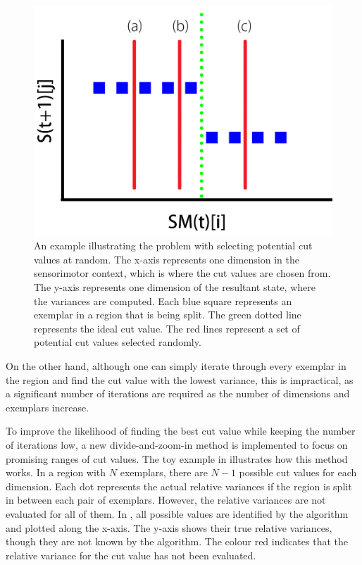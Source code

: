 \begin{figure}[htb]
	\centering
	\includegraphics[width=0.7 \textwidth]{"fig/cbla/bad-cut-example"}
	\caption[An example of making undesirable cuts using randomly selection method]{An example illustrating the problem with selecting potential cut values at random. The x-axis represents one dimension in the sensorimotor context, which is where the cut values are chosen from. The y-axis represents one dimension of the resultant state, where the variances are computed. Each blue square represents an exemplar in a region that is being split. The green dotted line represents the ideal cut value. The red lines represent a set of potential cut values selected randomly.}
	\label{fig:bad-cut-example}
\end{figure}

On the other hand, although one can simply iterate through every exemplar in the region and find the cut value with the lowest variance, this is impractical, as a significant number of iterations are required as the number of dimensions and exemplars increase. 

To improve the likelihood of finding the best cut value while keeping the number of iterations low, a new divide-and-zoom-in method is implemented to focus on promising ranges of cut values. The toy example in  illustrates how this method works. In a region with $N$ exemplars, there are $N-1$ possible cut values for each dimension. Each dot represents the actual relative variances if the region is split in between each pair of exemplars. However, the relative variances are not evaluated for all of them. In , all possible values are identified by the algorithm and plotted along the x-axis. The y-axis shows their true relative variances, though they are not known by the algorithm. The colour red indicates that the relative variance for the cut value has not been evaluated. 

